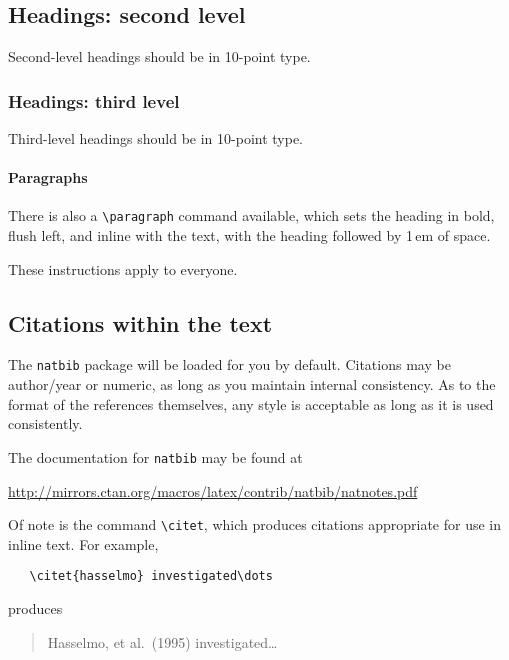 \documentclass{article}
\begin{document}
\subsection{Headings: second level}


Second-level headings should be in 10-point type.


\subsubsection{Headings: third level}


Third-level headings should be in 10-point type.


\paragraph{Paragraphs}


There is also a \verb+\paragraph+ command available, which sets the heading in
bold, flush left, and inline with the text, with the heading followed by 1\,em
of space.

\label{others}


These instructions apply to everyone.


\subsection{Citations within the text}


The \verb+natbib+ package will be loaded for you by default.  Citations may be
author/year or numeric, as long as you maintain internal consistency.  As to the
format of the references themselves, any style is acceptable as long as it is
used consistently.


The documentation for \verb+natbib+ may be found at
\begin{center}
  \url{http://mirrors.ctan.org/macros/latex/contrib/natbib/natnotes.pdf}
\end{center}
Of note is the command \verb+\citet+, which produces citations appropriate for
use in inline text.  For example,
\begin{verbatim}
   \citet{hasselmo} investigated\dots
\end{verbatim}
produces
\begin{quote}
  Hasselmo, et al.\ (1995) investigated\dots
\end{quote}
\end{document}
